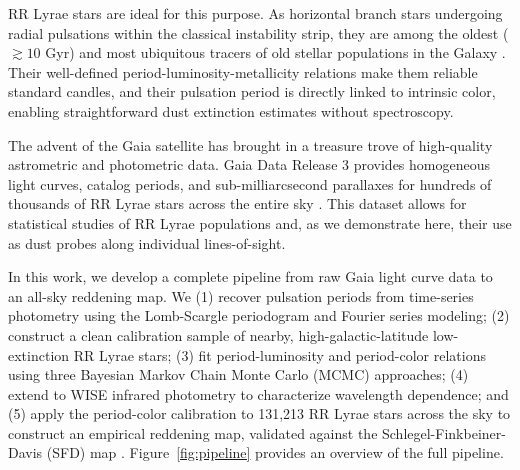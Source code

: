 \documentclass[10pt,preprint2]{aastex}
\begin{document}
RR Lyrae stars are ideal for this purpose. As horizontal branch stars undergoing radial pulsations within the classical instability strip, they are among the oldest ($\gtrsim 10$ Gyr) and most ubiquitous tracers of old stellar populations in the Galaxy \citep{CatelanSmith2015}. Their well-defined period-luminosity-metallicity relations make them reliable standard candles, and their pulsation period is directly linked to intrinsic color, enabling straightforward dust extinction estimates without spectroscopy.

The advent of the Gaia satellite \citep{Gaia2016} has brought in a treasure trove of high-quality astrometric and photometric data. Gaia Data Release 3 \citep{GaiaDR3_2023} provides homogeneous light curves, catalog periods, and sub-milliarcsecond parallaxes for hundreds of thousands of RR Lyrae stars across the entire sky \citep{Clementini2023}. This dataset allows for statistical studies of RR Lyrae populations and, as we demonstrate here, their use as dust probes along individual lines-of-sight.

In this work, we develop a complete pipeline from raw Gaia light curve data to an all-sky reddening map. We (1) recover pulsation periods from time-series photometry using the Lomb-Scargle periodogram and Fourier series modeling; (2) construct a clean calibration sample of nearby, high-galactic-latitude low-extinction RR Lyrae stars; (3) fit period-luminosity and period-color relations using three Bayesian Markov Chain Monte Carlo (MCMC) approaches; (4) extend to WISE infrared photometry to characterize wavelength dependence; and (5) apply the period-color calibration to 131,213 RR Lyrae stars across the sky to construct an empirical reddening map, validated against the Schlegel-Finkbeiner-Davis (SFD) map \citep{SFD1998}. Figure~\ref{fig:pipeline} provides an overview of the full pipeline.
\end{document}
